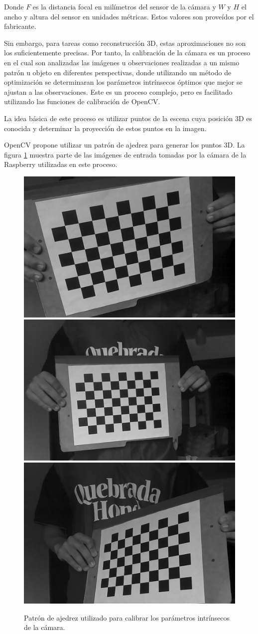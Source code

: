Donde $F$ es la distancia focal en milímetros del sensor de la cámara y $W$ y $H$ el ancho y altura del sensor en unidades métricas. Estos valores son proveídos por el fabricante.

Sin embargo, para tareas como reconstrucción 3D, estas aproximaciones no son los suficientemente precisas. Por tanto, la calibración de la cámara es un proceso en el cual son analizadas las imágenes u observaciones  realizadas a un mismo patrón u objeto en diferentes perspectivas, donde utilizando un método de optimización se determinaran los parámetros intrínsecos óptimos  que mejor se ajustan a las observaciones. Este es un proceso complejo, pero es facilitado utilizando las funciones de calibración de OpenCV.



La idea básica de este proceso es utilizar puntos de la escena cuya posición 3D es conocida y determinar la proyección de estos puntos en la imagen.

OpenCV propone utilizar un patrón de ajedrez para generar los puntos 3D. La figura \ref{imagen:CalibracionCamara} muestra parte de las imágenes de entrada tomadas por  la cámara de la Raspberry utilizadas en este proceso. 

\begin{figure}[H]
	\centering
	\includegraphics[width=0.3\linewidth]{imagenes/prototipo/Calibracion/frame_010}
	\includegraphics[width=0.3\linewidth]{imagenes/prototipo/Calibracion/frame_021}			\includegraphics[width=0.3\linewidth]{imagenes/prototipo/Calibracion/frame_031}
	\caption{Patrón de ajedrez utilizado para calibrar los parámetros intrínsecos de la  cámara.}
	\label{imagen:CalibracionCamara}
\end{figure}

